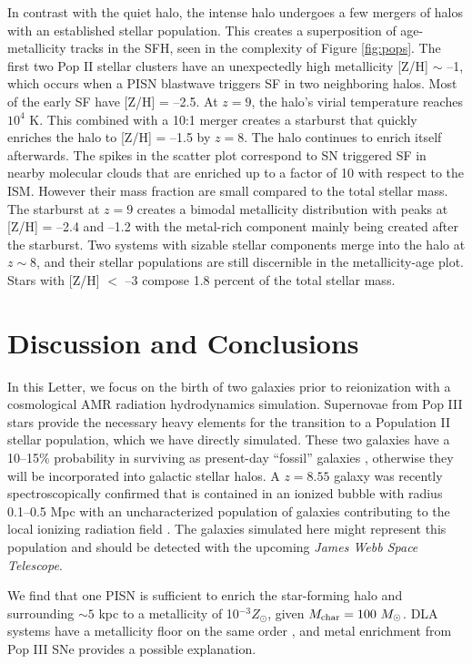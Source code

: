\documentclass[12pt,preprint]{aastex}
\newcommand{\Ms}{\ifmmode{M_\odot}\else{$M_\odot$}\fi}
\newcommand\tento[1]{$10^{#1}$}
\begin{document}
In contrast with the quiet halo, the intense halo undergoes a few
mergers of halos with an established stellar population.  This creates
a superposition of age-metallicity tracks in the SFH, seen in the
complexity of Figure \ref{fig:pops}.  The first two Pop II stellar
clusters have an unexpectedly high metallicity [Z/H] $\sim$ --1, which
occurs when a PISN blastwave triggers SF in two neighboring halos.
Most of the early SF have [Z/H] = --2.5.  At $z=9$, the halo's virial
temperature reaches \tento{4} K.  This combined with a 10:1 merger
creates a starburst that quickly enriches the halo to [Z/H] = --1.5 by
$z=8$.  The halo continues to enrich itself afterwards.  The spikes in
the scatter plot correspond to SN triggered SF in nearby molecular
clouds that are enriched up to a factor of 10 with respect to the ISM.
However their mass fraction are small compared to the total stellar
mass.  The starburst at $z=9$ creates a bimodal metallicity
distribution with peaks at [Z/H] = --2.4 and --1.2 with the metal-rich
component mainly being created after the starburst.  Two systems with
sizable stellar components merge into the halo at $z \sim 8$, and
their stellar populations are still discernible in the metallicity-age
plot.  Stars with [Z/H] $<$ --3 compose 1.8 percent of the total
stellar mass.

\section{Discussion and Conclusions}

In this Letter, we focus on the birth of two galaxies prior to
reionization with a cosmological AMR radiation hydrodynamics
simulation.  Supernovae from Pop III stars provide the necessary heavy
elements for the transition to a Population II stellar population,
which we have directly simulated.  These two galaxies have a 10--15\%
probability in surviving as present-day ``fossil'' galaxies
\citep{Gnedin06}, otherwise they will be incorporated into galactic
stellar halos.  A $z=8.55$ galaxy was recently spectroscopically
confirmed that is contained in an ionized bubble with radius 0.1--0.5
Mpc with an uncharacterized population of galaxies contributing to the
local ionizing radiation field \citep{Lehnert10_z8.6}.  The galaxies
simulated here might represent this population and should be detected
with the upcoming \textit{James Webb Space Telescope}.

We find that one PISN is sufficient to enrich the star-forming halo
and surrounding $\sim 5$ kpc to a metallicity of 10$^{-3} Z_\odot$,
given $M_{\rm char} = 100~\Ms$.  DLA systems have a metallicity floor
on the same order \citep{Wolfe05_Review}, and metal enrichment from Pop
III SNe provides a possible explanation.
\end{document}
